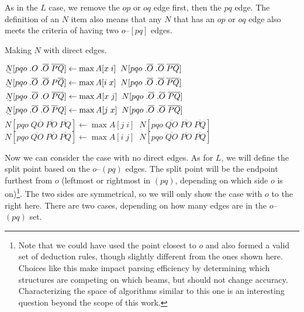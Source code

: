 As in the $L$ case, we remove the $op$ or $oq$ edge first, then the $pq$ edge.
The definition of an $N$ item also means that any $N$ that has an $op$ or $oq$ edge also meets the criteria of having two $o$--$[pq]$ edges.

\begin{finalEquation}
\caption{Making $N$ with direct edges.}
  $\uwave{N}[pqo \; .O \; .\overline{O} \; \overline{PQ}] \leftarrow \max A[x \; i] \; \; N[pqo \; .\overline{O} \; .\overline{O} \; \overline{PQ}]$ \\
  $\uwave{N}[pqo \; .\overline{O} \; .\overline{O} \; P\overline{Q}] \leftarrow \max A[i \; x] \; \; N[pqo \; .\overline{O} \; .\overline{O} \; \overline{PQ}]$ \\
  $\uwave{N}[pqo \; .\overline{O} \; .O \; \overline{PQ}] \leftarrow \max A[x \; j] \; \; N[pqo \; .\overline{O} \; .\overline{O} \; \overline{PQ}]$ \\
  $\uwave{N}[pqo \; .\overline{O} \; .\overline{O} \; \overline{P}Q] \leftarrow \max A[j \; x] \; \; N[pqo \; .\overline{O} \; .\overline{O} \; \overline{PQ}]$ \\
  $N[pqo \; Q\overline{O} \; \overline{PO} \; \overline{PQ}] \leftarrow \max A[j \; i] \; \; N[pqo \; \overline{QO} \; \overline{PO} \; \overline{PQ}]$ \\
  $N[pqo \; \overline{QO} \; P\overline{O} \; \overline{PQ}] \leftarrow \max A[i \; j] \; \; N[pqo \; \overline{QO} \; \overline{PO} \; \overline{PQ}]$
\end{finalEquation}

\begin{center}
\end{center}

Now we can consider the case with no direct edges.
As for $L$, we will define the split point based on the $o$--$(pq)$ edges.
The split point will be the endpoint furthest from $o$ (\myie leftmost or rightmost in $(pq)$, depending on which side $o$ is on)\footnote{
Note that we could have used the point closest to $o$ and also formed a valid set of deduction rules, though slightly different from the ones shown here.
Choices like this make impact parsing efficiency by determining which structures are competing on which beams, but should not change accuracy.
Characterizing the space of algorithms similar to this one is an interesting question beyond the scope of this work.
}.
The two sides are symmetrical, so we will only show the case with $o$ to the right here.
There are two cases, depending on how many edges are in the $o$--$(pq)$ set.

